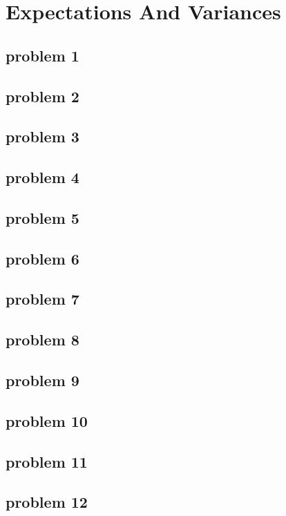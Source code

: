 \section{Expectations And Variances}

\subsection{problem 1}


\subsection{problem 2}


\subsection{problem 3}


\subsection{problem 4}


\subsection{problem 5}


\subsection{problem 6}


\subsection{problem 7}


\subsection{problem 8}


\subsection{problem 9}


\subsection{problem 10}


\subsection{problem 11}


\subsection{problem 12}

